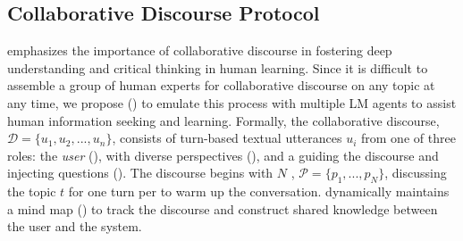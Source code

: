 \documentclass[11pt]{article}
\begin{document}
\subsection{Collaborative Discourse Protocol}
\label{sec:discourse_protocol}
\citet{nussbaum2008collaborative} emphasizes the importance of collaborative discourse in fostering deep understanding and critical thinking in human learning. Since it is difficult to assemble a group of human experts for collaborative discourse on any topic at any time, we propose \system () to emulate this process with multiple LM agents to assist human information seeking and learning. Formally, the collaborative discourse, $\mathcal{D}=\{u_1, u_2, ..., u_n\}$, consists of turn-based textual utterances $u_i$ from one of three roles: 
the \textit{user} (), \textit{\experts} with diverse perspectives (), and a \textit{\moderator} guiding the discourse and injecting questions (). The discourse begins with $N$ \experts, $\mathcal{P}=\{p_1, ..., p_N\}$, discussing the topic $t$ for one turn per \expert to warm up the conversation. \system dynamically maintains a mind map () to track the discourse and construct shared knowledge between the user and the system.
\end{document}
